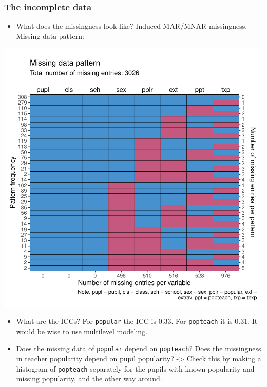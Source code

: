 \documentclass[
]{jss}
\providecommand{\tightlist}{%
  \setlength{\itemsep}{0pt}\setlength{\parskip}{0pt}}
\begin{document}
\hypertarget{the-incomplete-data}{%
\subsubsection{The incomplete data}\label{the-incomplete-data}}

\begin{itemize}
\tightlist
\item
  What does the missingness look like? Induced MAR/MNAR missingness.
  Missing data pattern:
\end{itemize}

\begin{CodeChunk}


\begin{center}\includegraphics{Manuscript_files/figure-latex/pop_pat-1} \end{center}

\end{CodeChunk}

\begin{itemize}
\item
  What are the ICCs? For \texttt{popular} the ICC is 0.33. For
  \texttt{popteach} it is 0.31. It would be wise to use multilevel
  modeling.
\item
  Does the missing data of \texttt{popular} depend on \texttt{popteach}?
  Does the missingness in teacher popularity depend on pupil popularity?
  -\textgreater{} Check this by making a histogram of \texttt{popteach}
  separately for the pupils with known popularity and missing
  popularity, and the other way around.
\end{itemize}
\end{document}

